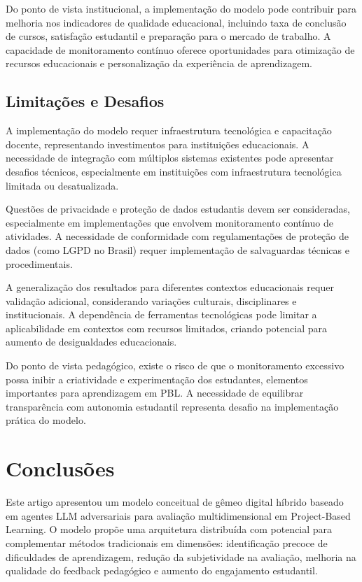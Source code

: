 \documentclass[english, spanish, brazilian]{modelo_dt}
\begin{document}
Do ponto de vista institucional, a implementação do modelo pode contribuir para
melhoria nos indicadores de qualidade educacional, incluindo taxa de conclusão
de cursos, satisfação estudantil e preparação para o mercado de trabalho\@. A
capacidade de monitoramento contínuo oferece oportunidades para otimização de
recursos educacionais e personalização da experiência de aprendizagem\@.

\subsection{Limitações e Desafios}

A implementação do modelo requer infraestrutura tecnológica e capacitação
docente, representando investimentos para instituições educacionais\@. A
necessidade de integração com múltiplos sistemas existentes pode apresentar
desafios técnicos, especialmente em instituições com infraestrutura tecnológica
limitada ou desatualizada\@.

Questões de privacidade e proteção de dados estudantis devem ser consideradas,
especialmente em implementações que envolvem monitoramento contínuo de
atividades\@. A necessidade de conformidade com regulamentações de proteção de
dados (como LGPD no Brasil) requer implementação de salvaguardas técnicas e
procedimentais\@.

A generalização dos resultados para diferentes contextos educacionais requer
validação adicional, considerando variações culturais, disciplinares e
institucionais\@. A dependência de ferramentas tecnológicas pode limitar a
aplicabilidade em contextos com recursos limitados, criando potencial para
aumento de desigualdades educacionais\@.

Do ponto de vista pedagógico, existe o risco de que o monitoramento excessivo
possa inibir a criatividade e experimentação dos estudantes, elementos
importantes para aprendizagem em PBL\@. A necessidade de equilibrar
transparência com autonomia estudantil representa desafio na implementação
prática do modelo\@.

\section{Conclusões}

Este artigo apresentou um modelo conceitual de gêmeo digital híbrido baseado em
agentes LLM adversariais para avaliação multidimensional em Project-Based
Learning\@. O modelo propõe uma arquitetura distribuída com potencial para
complementar métodos tradicionais em dimensões: identificação precoce de
dificuldades de aprendizagem, redução da subjetividade na avaliação, melhoria
na qualidade do feedback pedagógico e aumento do engajamento estudantil\@.
\end{document}
